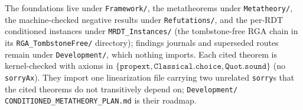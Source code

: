 \documentclass[11pt]{article}
\newcommand{\lean}[1]{\texttt{#1}}
\begin{document}
The foundations live under \lean{Framework/}, the metatheorems under
\lean{Metatheory/}, the machine-checked negative results under
\lean{Refutations/}, and the per-RDT conditioned instances under
\lean{MRDT\_Instances/} (the tombstone-free RGA chain in its
\lean{RGA\_TombstoneFree/} directory); findings journals and superseded
routes remain under \lean{Development/}, which nothing imports. Each cited theorem is kernel-checked
with axioms in $\{\lean{propext},
\lean{Classical.choice}, \lean{Quot.sound}\}$ (no \lean{sorryAx}). They
import one linearization file carrying two unrelated \lean{sorry}s that the
cited theorems do not transitively depend on; \lean{Development/}%
\lean{CONDITIONED\_METATHEORY\_PLAN.md} is their roadmap.
\end{document}
